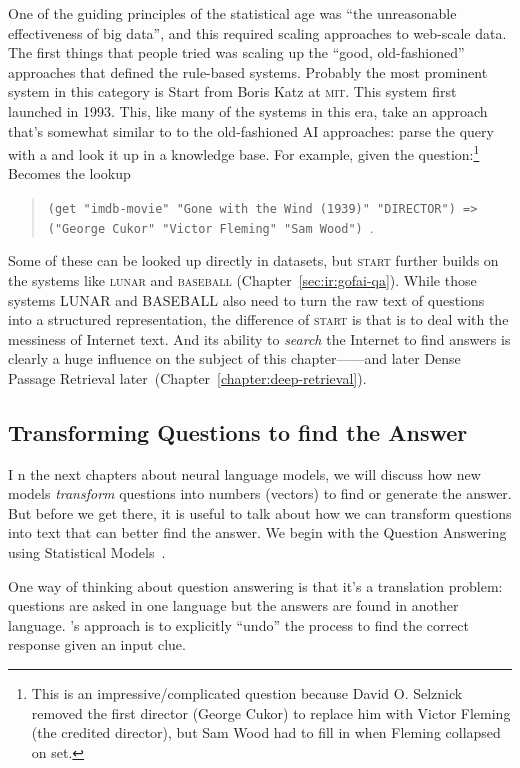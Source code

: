 One of the guiding principles of the statistical age was ``the
unreasonable effectiveness of big data'', and this required scaling 
approaches to web-scale data.
%
The first things that people tried was scaling up the ``good,
old-fashioned'' approaches that defined the rule-based systems.
%
Probably the most prominent system in this category is Start from Boris Katz
at \textsc{mit}.  This system first launched in 1993.
%
This, like many of the systems in
this era, take an approach that’s somewhat similar to to the old-fashioned AI
approaches: parse the query with a and look it up in a knowledge base.
%
For example, given the question:\footnote{This is an impressive/complicated question
    because David O. Selznick removed the first director (George Cukor) to
    replace him with Victor Fleming (the credited director), but Sam Wood had
    to fill in when Fleming collapsed on set.}
%
%
Becomes the lookup
\begin{quote}
  \texttt{(get "imdb-movie" "Gone with the Wind (1939)" "DIRECTOR") =>
    ("George Cukor" "Victor Fleming" "Sam Wood")}~\citep{katz-02}.
\end{quote}
%
Some of these can be looked up directly in datasets, but \textsc{start}
further builds on the systems like \textsc{lunar} and \textsc{baseball}
(Chapter~\ref{sec:ir:gofai-qa}).
%
While those systems LUNAR and
BASEBALL also need to turn the raw text of questions into a structured
representation, the difference of \textsc{start} is that
is to deal with the
messiness of Internet text.
%
And its ability to \emph{search} the
Internet to find answers is clearly a huge influence on the subject of this
chapter---\watson{}---and later Dense Passage
Retrieval later~(Chapter~\ref{chapter:deep-retrieval}).

\subsection{Transforming Questions to find the Answer}
I
n the next chapters about neural language models, we will discuss how new
models \emph{transform} questions into numbers (vectors) to find or generate
the answer.
%
But before we get there, it is useful to talk about how we can transform
questions into text that can better find the answer.
%
We begin with the Question Answering using Statistical Models~\citep[]{radev-01}.

One way of thinking about question answering is that it's a translation
problem: questions are asked in one language but the answers are found in
another language.
%
's approach is to explicitly ``undo'' the process to find the
correct response given an input clue.

